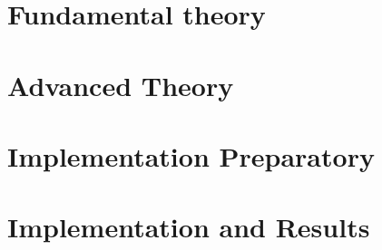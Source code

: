 
	
    
    
    
    \part{Fundamental theory}
    
    
    
    
    \part{Advanced Theory}
    
    
    
    \part{Implementation Preparatory}
    
    
 
 	\part{Implementation and Results}
    
    
    
    
    \appendix
    
    
    
    
    
    \newpage
    \nocite{*}
    \printbibliography

